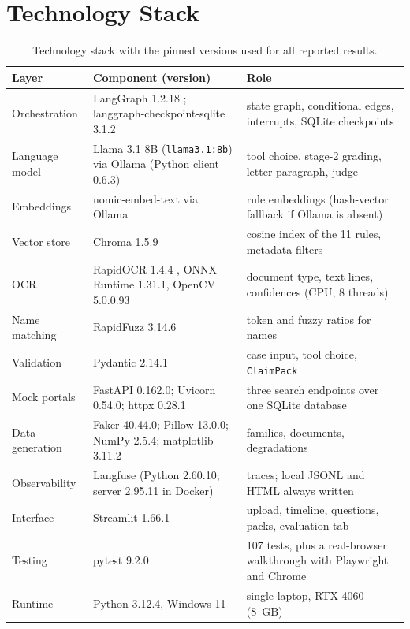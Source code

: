 \documentclass[12pt,a4paper,oneside]{report}
\begin{document}
\section{Technology Stack}
\begin{table}[H]
\centering\footnotesize{}
\caption[Technology stack]{Technology stack with the pinned versions used for all reported results.}\label{tab:stack}
\renewcommand{\arraystretch}{1.1}
\begin{tabularx}{\linewidth}{@{}p{3.1cm}p{3.7cm}X@{}}
\toprule
\textbf{Layer} & \textbf{Component (version)} & \textbf{Role} \\ \midrule
Orchestration & LangGraph 1.2.18 \cite{langgraph}; langgraph-checkpoint-sqlite 3.1.2 & state graph, conditional edges, interrupts, SQLite checkpoints \\
Language model & Llama 3.1 8B \cite{llama3} (\texttt{llama3.1:8b}) via Ollama \cite{ollama} (Python client 0.6.3) & tool choice, stage-2 grading, letter paragraph, judge \\
Embeddings & nomic-embed-text \cite{nomic2024} via Ollama & rule embeddings (hash-vector fallback if Ollama is absent) \\
Vector store & Chroma 1.5.9 \cite{chroma} & cosine index of the 11 rules, metadata filters \\
OCR & RapidOCR 1.4.4 \cite{rapidocr}, ONNX Runtime 1.31.1, OpenCV 5.0.0.93 & document type, text lines, confidences (CPU, 8 threads) \\
Name matching & RapidFuzz 3.14.6 & token and fuzzy ratios for names \\
Validation & Pydantic 2.14.1 & case input, tool choice, \texttt{ClaimPack} \\
Mock portals & FastAPI 0.162.0; Uvicorn 0.54.0; httpx 0.28.1 & three search endpoints over one SQLite database \\
Data generation & Faker 40.44.0; Pillow 13.0.0; NumPy 2.5.4; matplotlib 3.11.2 & families, documents, degradations \\
Observability & Langfuse \cite{langfuse} (Python 2.60.10; server 2.95.11 in Docker) & traces; local JSONL and HTML always written \\
Interface & Streamlit 1.66.1 & upload, timeline, questions, packs, evaluation tab \\
Testing & pytest 9.2.0 & 107 tests, plus a real-browser walkthrough with Playwright and Chrome \\
Runtime & Python 3.12.4, Windows 11 & single laptop, RTX 4060 (8~GB) \\ \bottomrule
\end{tabularx}
\end{table}
\end{document}
